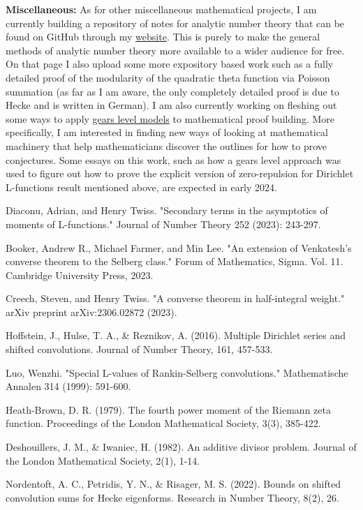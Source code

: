 \documentclass[12pt,reqno,oneside]{amsart}
\begin{document}
\textbf{Miscellaneous:}
As for other miscellaneous mathematical projects, I am currently building a repository of notes for analytic number theory that can be found on GitHub through my \href{https://www.henrytwiss.com/writing-projects}{website}. This is purely to make the general methods of analytic number theory more available to a wider audience for free. On that page I also upload some more expository based work such as a fully detailed proof of the modularity of the quadratic theta function via Poisson summation (as far as I am aware, the only completely detailed proof is due to Hecke and is written in German). I am also currently working on fleshing out some ways to apply \href{https://www.lesswrong.com/tag/gears-level}{gears level models} to mathematical proof building. More specifically, I am interested in finding new ways of looking at mathematical machinery that help mathematicians discover the outlines for how to prove conjectures. Some essays on this work, such as how a gears level approach was used to figure out how to prove the explicit version of zero-repulsion for Dirichlet L-functions result mentioned above, are expected in early 2024.

\begin{thebibliography}{99}
  Diaconu, Adrian, and Henry Twiss. "Secondary terms in the asymptotics of moments of L-functions." Journal of Number Theory 252 (2023): 243-297.

  Booker, Andrew R., Michael Farmer, and Min Lee. "An extension of Venkatesh’s converse theorem to the Selberg class." Forum of Mathematics, Sigma. Vol. 11. Cambridge University Press, 2023.

  Creech, Steven, and Henry Twiss. "A converse theorem in half-integral weight." arXiv preprint arXiv:2306.02872 (2023).

  Hoffstein, J., Hulse, T. A., \& Reznikov, A. (2016). Multiple Dirichlet series and shifted convolutions. Journal of Number Theory, 161, 457-533.

  Luo, Wenzhi. "Special L-values of Rankin-Selberg convolutions." Mathematische Annalen 314 (1999): 591-600.


  Heath-Brown, D. R. (1979). The fourth power moment of the Riemann zeta function. Proceedings of the London Mathematical Society, 3(3), 385-422.

  Deshouillers, J. M., \& Iwaniec, H. (1982). An additive divisor problem. Journal of the London Mathematical Society, 2(1), 1-14.

  Nordentoft, A. C., Petridis, Y. N., \& Risager, M. S. (2022). Bounds on shifted convolution sums for Hecke eigenforms. Research in Number Theory, 8(2), 26.
\end{thebibliography}
\end{document}
